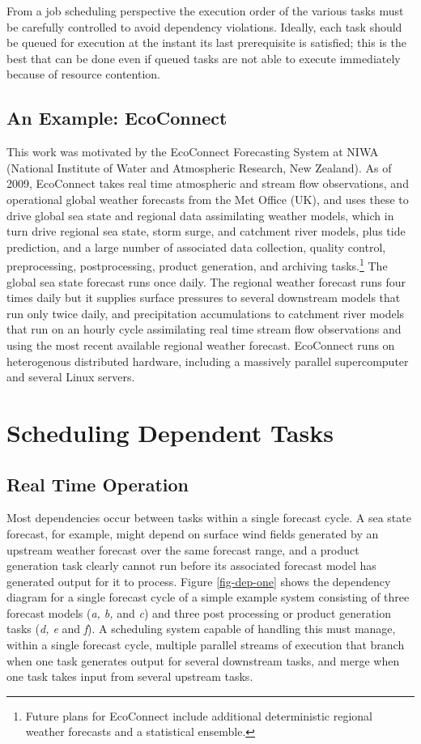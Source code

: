 \documentclass[11pt,a4paper]{article}
\begin{document}
From a job scheduling perspective the execution order of the various
tasks must be carefully controlled to avoid dependency violations.
Ideally, each task should be queued for execution at the instant its
last prerequisite is satisfied; this is the best that can be done even
if queued tasks are not able to execute immediately because of resource
contention.


\subsection{An Example: EcoConnect}

This work was motivated by the EcoConnect Forecasting System at NIWA
(National Institute of Water and Atmospheric Research, New Zealand). As
of 2009, EcoConnect takes real time atmospheric and stream flow
observations, and operational global weather forecasts from the Met
Office (UK), and uses these to drive global sea state and regional data
assimilating weather models, which in turn drive regional sea state,
storm surge, and catchment river models, plus tide prediction, and a
large number of associated data collection, quality control,
preprocessing, postprocessing, product generation, and archiving
tasks.\footnote{Future plans for EcoConnect include additional
deterministic regional weather forecasts and a statistical ensemble.}
The global sea state forecast runs once daily.  The regional weather
forecast runs four times daily but it supplies surface pressures to
several downstream models that run only twice daily, and precipitation
accumulations to catchment river models that run on an hourly cycle
assimilating real time stream flow observations and using the most
recent available regional weather forecast.  EcoConnect runs on
heterogenous distributed hardware, including a massively parallel
supercomputer and several Linux servers. 

\section{Scheduling Dependent Tasks }

\subsection{Real Time Operation}

Most dependencies occur between tasks within a single forecast cycle. A
sea state forecast, for example, might depend on surface wind fields
generated by an upstream weather forecast over the same forecast range,
and a product generation task clearly cannot run before its associated
forecast model has generated output for it to process. Figure
\ref{fig-dep-one} shows the dependency diagram for a single forecast
cycle of a simple example system consisting of three forecast models
({\em a, b,} and {\em c}) and three post processing or product
generation tasks ({\em d, e} and {\em f}).  A scheduling system capable
of handling this must manage, within a single forecast cycle, multiple
parallel streams of execution that branch when one task generates output
for several downstream tasks, and merge when one task takes input from
several upstream tasks. 
\end{document}
